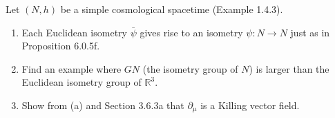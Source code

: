 Let $(N, h)$ be a simple cosmological spacetime (Example 1.4.3).
\begin{enumerate}
  \item[(a)] Each Euclidean isometry $\bar{\psi}$ gives rise to an isometry $\psi: N \to N$ just as in Proposition 6.0.5f.
  \item[(b)] Find an example where $G N$ (the isometry group of $N$) is larger than the Euclidean isometry group of $\mathbb{R}^3$.
  \item[(c)] Show from (a) and Section 3.6.3a that $\partial_\mu$ is a Killing vector field.
\end{enumerate}
